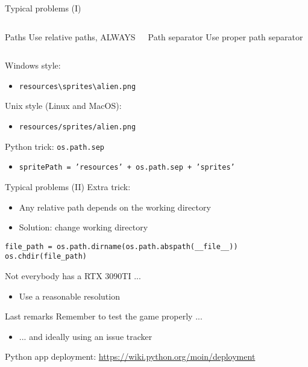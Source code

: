 \documentclass[10pt,compress]{beamer} %
\begin{document}
\begin{frame}[fragile]{Typical problems (I)}
    \begin{columns}
		\begin{alertblock}{Paths}
		Use relative paths, ALWAYS
		\end{alertblock}

		\begin{alertblock}{Path separator}
		Use proper path separator
		\end{alertblock}
   	\end{columns}

	\bigskip

	Windows style:
	\begin{itemize}
	\item \texttt{resources\textbackslash sprites\textbackslash alien.png}
	\end{itemize}

	Unix style (Linux and MacOS):
	\begin{itemize}
	\item \texttt{resources/sprites/alien.png}
	\end{itemize}

	Python trick: \texttt{os.path.sep}
	\begin{itemize}
		\item \texttt{spritePath = 'resources' + os.path.sep + 'sprites'}
	\end{itemize}
\end{frame}

\begin{frame}[fragile]{Typical problems (II)}
    Extra trick:
    \begin{itemize}
        \item Any relative path depends on the working directory
        \item Solution: change working directory
    \end{itemize}

    \begin{block}{}
    \begin{verbatim}
file_path = os.path.dirname(os.path.abspath(__file__))
os.chdir(file_path)
\end{verbatim}
\end{block}

    Not everybody has a RTX 3090TI ...
    \begin{itemize}
        \item Use a reasonable resolution
    \end{itemize}
\end{frame}

\begin{frame}{Last remarks}
	Remember to test the game properly ...
	    \begin{itemize}
		    \item ... and ideally using an issue tracker
	    \end{itemize}
	\bigskip
	Python app deployment: \url{https://wiki.python.org/moin/deployment}
\end{frame}
\end{document}
